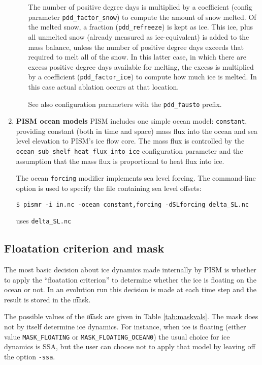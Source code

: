 \begin{enumerate}
\begin{itemize}
The number of positive degree days is multiplied by a coefficient (config parameter \texttt{pdd_factor_snow}) to compute the amount of snow melted.  Of the melted snow, a fraction (\texttt{pdd_refreeze}) is kept as ice.  This ice, plus all unmelted snow (already measured as ice-equivalent) is added to the mass balance, unless the number of positive degree days exceeds that required to melt all of the snow.  In this latter case, in which there are excess positive degree days available for melting, the excess is multiplied by a coefficient (\texttt{pdd_factor_ice}) to compute how much ice is melted.  In this case actual ablation occurs at that location.

See also configuration parameters with the \texttt{pdd_fausto} prefix.

 \end{itemize}
\item \textbf{PISM ocean models}
  PISM includes one simple ocean model: \texttt{constant}, providing constant (both in time and space) mass flux into the ocean and sea level elevation to PISM's ice flow core. The mass flux is controlled by the\\ \texttt{ocean_sub_shelf_heat_flux_into_ice} configuration parameter and the assumption that the mass flux is proportional to heat flux into ice.

  The ocean \texttt{forcing} modifier implements sea level forcing. The command-line option  is used to specify the file containing sea level offsets:
\begin{verbatim}
$ pismr -i in.nc -ocean constant,forcing -dSLforcing delta_SL.nc
\end{verbatim}%
uses \texttt{delta_SL.nc}
\end{enumerate}
  
\subsection{Floatation criterion and mask} \label{subsect:floatmask}  The most basic decision about ice dynamics made internally by PISM is whether to apply the ``floatation criterion'' to determine whether the ice is floating on the ocean or not.  In an evolution run this decision is made at each time step and the result is stored in the \t{mask}.

The possible values of the \t{mask} are given in Table \ref{tab:maskvals}.  The mask does not by itself determine ice dynamics.  For instance, when ice is floating (either value \texttt{MASK_FLOATING} or \texttt{MASK_FLOATING_OCEAN0}) the usual choice for ice dynamics is SSA, but the user can choose not to apply that model by leaving off the option \texttt{-ssa}.

